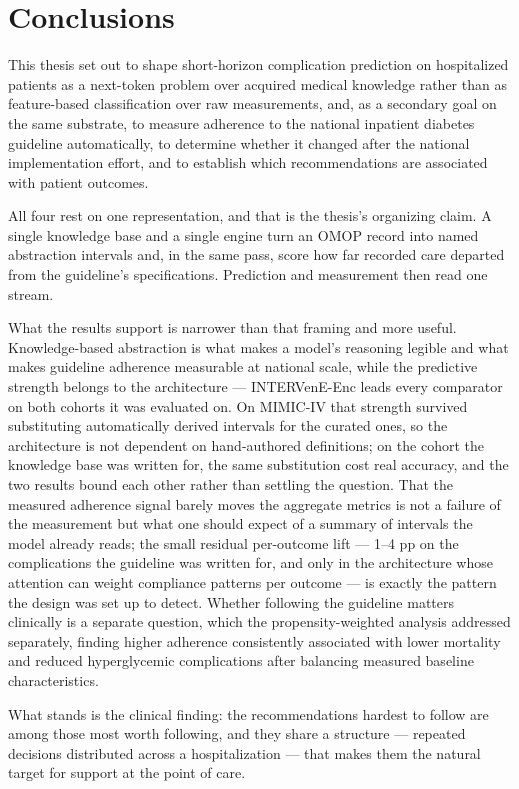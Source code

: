\section{Conclusions}
\label{sec:conclusions}

This thesis set out to shape short-horizon complication prediction on
hospitalized patients as a next-token problem over acquired medical knowledge
rather than as feature-based classification over raw measurements, and, as a
secondary goal on the same substrate, to measure adherence to the national
inpatient diabetes guideline automatically, to determine whether it changed
after the national implementation effort, and to establish which
recommendations are associated with patient outcomes.

All four rest on one representation, and that is the thesis's organizing claim.
A single knowledge base and a single engine turn an OMOP record into named
abstraction intervals and, in the same pass, score how far recorded care
departed from the guideline's specifications. Prediction and measurement then
read one stream.

What the results support is narrower than that framing and more useful.
Knowledge-based abstraction is what makes a model's reasoning legible and what
makes guideline adherence measurable at national scale, while the predictive
strength belongs to the architecture --- INTERVenE-Enc leads every comparator on
both cohorts it was evaluated on. On MIMIC-IV that strength survived
substituting automatically derived intervals for the curated ones, so the
architecture is not dependent on hand-authored definitions; on the cohort the
knowledge base was written for, the same substitution cost real accuracy, and
the two results bound each other rather than settling the question. That the measured adherence signal barely moves the aggregate metrics is not
a failure of the measurement but what one should expect of a summary of
intervals the model already reads; the small residual per-outcome lift ---
1--4 pp on the complications the guideline was written for, and only in the
architecture whose attention can weight compliance patterns per outcome ---
is exactly the pattern the design was set up to detect. Whether following
the guideline matters clinically is a separate question, which the
propensity-weighted analysis addressed separately, finding higher
adherence consistently associated with lower mortality and reduced
hyperglycemic complications after balancing measured baseline
characteristics.

What stands is the clinical finding: the recommendations hardest to follow are
among those most worth following, and they share a structure --- repeated
decisions distributed across a hospitalization --- that makes them the natural
target for support at the point of care.
